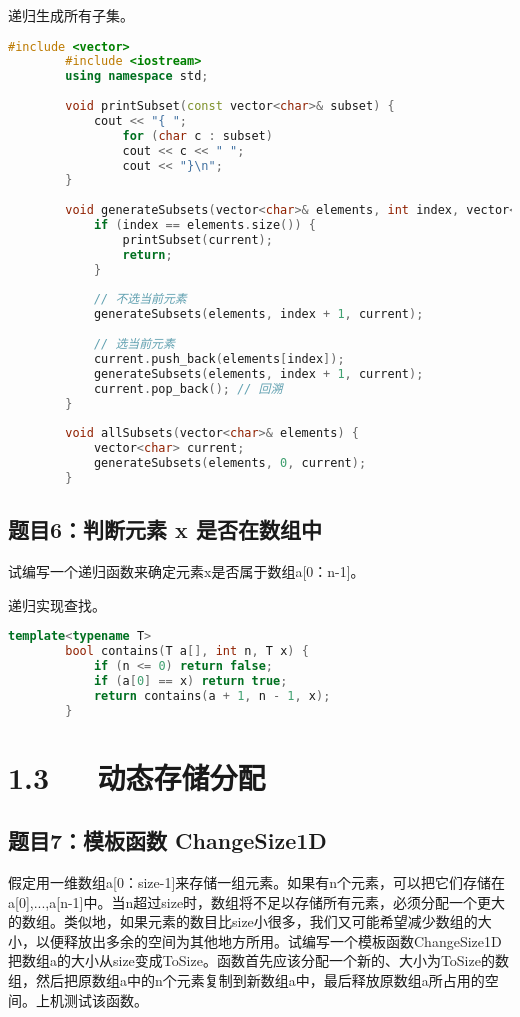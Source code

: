 \documentclass[UTF8]{ctexart}
\begin{document}
	递归生成所有子集。
	
	\begin{lstlisting}[language=C++]
		#include <vector>
		#include <iostream>
		using namespace std;
		
		void printSubset(const vector<char>& subset) {
			cout << "{ ";
				for (char c : subset)
				cout << c << " ";
				cout << "}\n";
		}
		
		void generateSubsets(vector<char>& elements, int index, vector<char>& current) {
			if (index == elements.size()) {
				printSubset(current);
				return;
			}
			
			// 不选当前元素
			generateSubsets(elements, index + 1, current);
			
			// 选当前元素
			current.push_back(elements[index]);
			generateSubsets(elements, index + 1, current);
			current.pop_back(); // 回溯
		}
		
		void allSubsets(vector<char>& elements) {
			vector<char> current;
			generateSubsets(elements, 0, current);
		}
	\end{lstlisting}
	
	\subsection{题目6：判断元素 x 是否在数组中}
	试编写一个递归函数来确定元素x是否属于数组a[0：n-1]。
	
	递归实现查找。
	
	\begin{lstlisting}[language=C++]
		template<typename T>
		bool contains(T a[], int n, T x) {
			if (n <= 0) return false;
			if (a[0] == x) return true;
			return contains(a + 1, n - 1, x);
		}
	\end{lstlisting}
	
	\section{1.3~~~动态存储分配}
	
	\subsection{题目7：模板函数 ChangeSize1D}
	假定用一维数组a[0：size-1]来存储一组元素。如果有n个元素，可以把它们存储在a[0],...,a[n-1]中。当n超过size时，数组将不足以存储所有元素，必须分配一个更大的数组。类似地，如果元素的数目比size小很多，我们又可能希望减少数组的大小，以便释放出多余的空间为其他地方所用。试编写一个模板函数ChangeSize1D把数组a的大小从size变成ToSize。函数首先应该分配一个新的、大小为ToSize的数组，然后把原数组a中的n个元素复制到新数组a中，最后释放原数组a所占用的空间。上机测试该函数。
	
\end{document}
